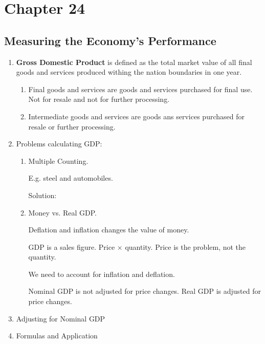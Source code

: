 \section{Chapter 24}

\subsection{Measuring the Economy's Performance}



\begin{enumerate}[label = (\Alph*)]
	\item \textbf{Gross Domestic Product} is defined as the total market value of all final goods and services produced withing the nation boundaries in one year.

		\begin{enumerate}[label = ---]
			\item Final goods and services are goods and services purchased for final use. Not for resale and not for further processing.
			\item Intermediate goods and services are goods ans services purchased for resale or further processing.
		\end{enumerate}

	\item[\textbullet] Problems calculating GDP:

		\begin{enumerate}[label = (\arabic*)]
			\item Multiple Counting.

				E.g. steel and automobiles. 

				Solution:

			\item Money vs. Real GDP.

				Deflation and inflation changes the value of money.

				GDP is a sales figure. Price $\times$ quantity. Price is the problem, not the quantity.

				We need to account for inflation and deflation.

				Nominal GDP is not adjusted for price changes. Real GDP is adjusted for price changes.
		\end{enumerate}

	\item Adjusting for Nominal GDP

	\item Formulas and Application


\end{enumerate}
